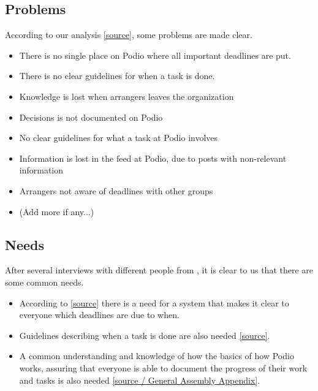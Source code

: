 \subsection{Problems}
\label{subsec:problems}
According to our analysis \ref{source}, some problems are made clear.
\begin{itemize}
    \item There is no single place on Podio where all important deadlines are put.
    \item There is no clear guidelines for when a task is done.
	 \item Knowledge is lost when arrangers leaves the organization
	 \item Decisions is not documented on Podio
	 \item No clear guidelines for what a task at Podio involves
	 \item Information is lost in the feed at Podio, due to posts with non-relevant information
	 \item Arrangers not aware of deadlines with other groups
    \item (Add more if any...)
	 
\end{itemize}

\subsection{Needs}
\label{subsec:needs}
After several interviews with different people from \mil, it is clear to us that
there are some common needs.
\begin{itemize}
    \item According to \ref{source} there is a need for a system that makes it
    clear to everyone which deadlines are due to when.
    \item Guidelines describing when a task is done are also needed
    \ref{source}.
    \item A common understanding and knowledge of how the basics of how Podio
    works, assuring that everyone is able to document the progress of their work
    and tasks is also needed \ref{source / General Assembly Appendix}.
\end{itemize}

